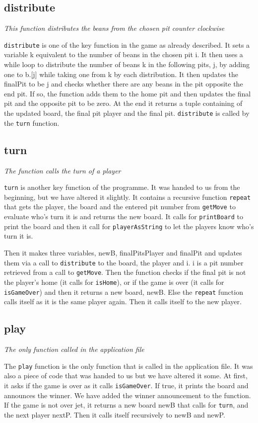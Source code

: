 \documentclass{report}
\begin{document}
\subsection*{distribute}
{\it This function distributes the beans from the chosen pit counter clockwise}

\texttt{distribute} is one of the key function in the game as already described. It sets a variable k equivalent to the number of beans in the chosen pit i. It then uses a while loop to distribute the number of beans k in the following pits, j, by adding one to b.[j] while taking one from k by each distribution. It then updates the finalPit to be j and checks whether there are any beans in the pit opposite the end pit. If so, the function adds them to the home pit and then updates the final pit and the opposite pit to be zero. At the end it returns a tuple containing of the updated board, the final pit player and the final pit. \texttt{distribute} is called by the \texttt{turn} function.

\subsection*{turn}
{\it The function calls the turn of a player}

\texttt{turn} is another key function of the programme. It was handed  to us from the beginning, but we have altered it slightly. It contains a recursive function \texttt{repeat} that gets the player, the board and the entered 	pit number from \texttt{getMove} to evaluate who's turn it is and returns the new board. It calls for \texttt{printBoard} to print the board and then it call for \texttt{playerAsString} to let the players know who's turn it is. 

Then it makes three variables, newB, finalPitsPlayer and finalPit and updates them via a call to \texttt{distribute} to the board, the player and i. i is a pit number retrieved from a call to \texttt{getMove}. 
Then the function checks if the final pit is not the player's home (it calls for \texttt{isHome}), or if the game is over (it calls for \texttt{isGameOver}) and then it returns a new board, newB. Else the \texttt{repeat} function calls itself as it is the same player again. Then it calls itself to the new player.


\subsection*{play}
{\it The only function called in the application file}

The \texttt{play} function is the only function that is called in the application file. It was also a piece of code that was handed to us but we have altered it some.
At first, it asks if the game is over as it calls \texttt{isGameOver}. If true, it prints the board and announces the winner. We have added the winner announcement to the function. If the game is not over jet, it returns a new board newB that calls for \texttt{turn}, and the next player nextP. Then it calls itself recursively to newB and newP.
\end{document}
